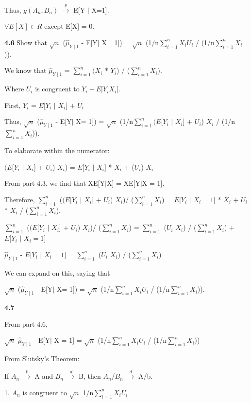 Thus, $g(A_{n}, B_{n})$ $\xrightarrow{p}$ E[Y $\mid$ X=1].

$\forall E[X] \in R$ except E[X] = 0.

\textbf{4.6} Show that $\sqrt{n}$ ($\hat{\mu}_{Y\mid1}$ - E[Y$\mid$ X= 1]) = $\sqrt{n}$ (1/n$\sum^n_{i=1} X_{i}U_{i}$ / (1/n$\sum^n_{i=1} X_{i}$)).

We know that 
$\hat{\mu}_{Y\mid1}$ = $\sum^n_{i=1} (X_{i}$ * $Y_{i}$) / ($\sum^n_{i=1} X_{i}$).

Where $U_{i}$ is congruent to $Y_{i} - E[Y_{i} $\mid$ X_{i}]$.

First, 
$Y_{i}$ = $E[Y_{i}$ $\mid$ $X_{i}$] + $U_{i}$

Thus,
$\sqrt{n}$ ($\hat{\mu}_{Y\mid1}$ - E[Y$\mid$ X= 1]) = $\sqrt{n}$ (1/n$\sum^n_{i=1} (E[Y_{i} $ $\mid$ $X_{i}]$ + $U_{i}$) $X_{i}$ / (1/n$\sum^n_{i=1} X_{i}$)).

To elaborate within the numerator:

$(E[Y_{i}$ $\mid$ $X_{i}$] + $U_{i}$) $X_{i}$) =  $E[Y_{i} $ $\mid$ $X_{i}]$ * $X_{i}$ + ($U_{i}$) $X_{i}$ 

From part 4.3, we find that XE[Y$\mid$X] = XE[Y$\mid$X = 1].

Therefore, $\sum^n_{i=1}$ ($(E[Y_{i}$ $\mid$ $X_{i}$] + $U_{i}$) $X_{i}$)/ ($\sum^n_{i=1} X_{i}$) =  $E[Y_{i}$ $\mid$ $X_{i} = 1]$ * $X_{i}$ + $U_{i}$ * $X_{i}$ / ($\sum^n_{i=1} X_{i}$). 

$\sum^n_{i=1}$ ($(E[Y_{i}$ $\mid$ $X_{i}$] + $U_{i}$) $X_{i}$)/ ($\sum^n_{i=1} X_{i}$) = $\sum^n_{i=1}$ ($U_{i}$ $X_{i}$) / ($\sum^n_{i=1} X_{i}$) + $E[Y_{i}$ $\mid$ $X_{i} = 1]$  

$\hat{\mu}_{Y\mid1}$ - $E[Y_{i}$ $\mid$ $X_{i} = 1]$ = $\sum^n_{i=1}$ ($U_{i}$ $X_{i}$) / ($\sum^n_{i=1} X_{i}$)

We can expand on this, saying that 

$\sqrt{n}$ ($\hat{\mu}_{Y\mid1}$ - E[Y$\mid$ X= 1]) = $\sqrt{n}$ (1/n$\sum^n_{i=1} X_{i}U_{i}$ / (1/n$\sum^n_{i=1} X_{i}$)).

\textbf{4.7}

From part 4.6,

$\sqrt{n}$ $\hat{\mu}_{Y\mid1}$ - E[Y$\mid$ X = 1] = $\sqrt{n}$ (1/n$\sum^n_{i=1} X_{i}U_{i}$ / (1/n$\sum^n_{i=1} X_{i}$))

From Slutsky's Theorem:

If $A_{n}$ $\xrightarrow{p}$ A and $B_{n}$ $\xrightarrow{d}$ B, then $A_{n}$/$B_{n}$  $\xrightarrow{d}$ A/b.

1. $A_{n}$ is congruent to $\sqrt{n}$ 1/n$\sum^n_{i=1} X_{i}U_{i}$

